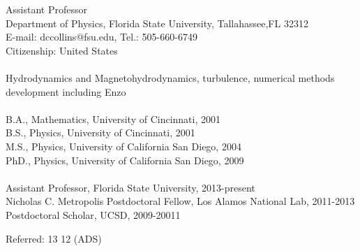 

 Assistant Professor                                                                \\
 Department of Physics, Florida State University, Tallahassee,FL 32312         \\
 E-mail: dccollins@fsu.edu, Tel.: 505-660-6749                       \\
 Citizenship: United States                                                   \\



                                                              \\  
 Hydrodynamics and Magnetohydrodynamics, turbulence, numerical methods
 development including Enzo \\
                                                                                                              
        \\  
B.A., Mathematics, University of Cincinnati, 2001\\
B.S., Physics, University of Cincinnati, 2001\\
M.S., Physics, University of California San Diego, 2004\\
PhD., Physics, University of California San Diego, 2009\\



        \\
\noindent
 Assistant Professor, Florida State University, 2013-present\\
 Nicholas C. Metropolis Postdoctoral Fellow, Los Alamos National Lab,
 2011-2013\\
 Postdoctoral Scholar, UCSD, 2009-20011

 Referred: 13
 12 (ADS)                                      \\

